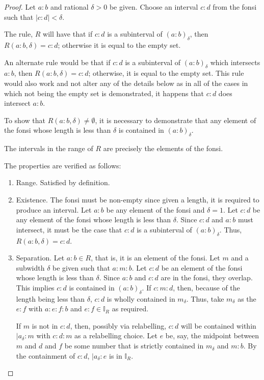\documentclass[12pt]{article}
\begin{document}
\begin{proof}
    Let $a:b$ and rational $\delta>0$ be given. Choose an interval $c:d$ from the fonsi such that $|c:d| < \delta$. 

    The rule, $R$ will have that if $c:d$ is a subinterval of $(a:b)_{\delta}$, then $R(a:b, \delta) = c:d$; otherwise it is equal to the empty set. 

    An alternate rule would be that if $c:d$ is a subinterval of $(a:b)_{\delta}$ which intersects $a:b$, then $R(a:b, \delta) = c:d$; otherwise, it is equal to the empty set. This rule would also work and not alter any of the details below as in all of the cases in which not being the empty set is demonstrated, it happens that $c:d$ does intersect $a:b$.

    To show that $R(a:b, \delta) \neq \emptyset$, it is necessary to demonstrate that any element of the fonsi whose length is less than $\delta$ is contained in $(a:b)_\delta$. 
    
    The intervals in the range of $R$ are precisely the elements of the fonsi. 

    The properties are verified as follows: 
    \begin{enumerate}
        \item Range. Satisfied by definition. 
        \item Existence. The fonsi must be non-empty since given a length, it is required to produce an interval. Let $a:b$ be any element of the fonsi and $\delta =1$. Let $c:d$ be any element of the fonsi whose length is less than $\delta$. Since $c:d$ and $a:b$ must intersect, it must be the case that $c:d$ is a subinterval of $(a:b)_\delta$. Thus, $R(a:b, \delta) = c:d$. 
        \item Separation. 
        Let $a:b \in R$, that is, it is an element of the fonsi. Let $m$ and a subwidth $\delta$ be given such that $a:m:b$. Let $c:d$ be an element of the fonsi whose length is less than $\delta$. Since $a:b$ and $c:d$ are in the fonsi, they overlap. This implies $c:d$ is contained in $(a:b)_\delta$. If $c:m:d$, then, because of the length being less than $\delta$, $c:d$ is wholly contained in $m_\delta$. Thus, take $m_\delta$ as the $e:f$ with $a:e:f:b$ and $e:f \in \mathbb{I}_{R}$ as required. 
        
        If $m$ is not in $c:d$, then, possibly via relabelling, $c:d$ will be contained within $|a_\delta:m$ with $c:d:m$ as a relabelling choice. Let $e$ be, say, the midpoint between $m$ and $d$ and $f$ be some number that is strictly contained in $m_\delta$ and $m:b$. By the containment of $c:d$, $|a_\delta:e$ is in $\mathbb{I}_R$.
        

\end{enumerate}
\end{proof}
\end{document}
